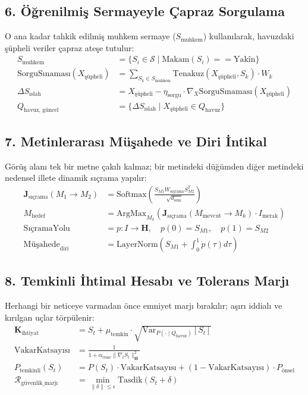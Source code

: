 \documentclass[11pt, a4paper]{article}
\begin{document}
\subsection{6. Öğrenilmiş Sermayeyle Çapraz Sorgulama}
O ana kadar tahkik edilmiş muhkem sermaye ($S_{\text{muhkem}}$) kullanılarak, havuzdaki şüpheli veriler çapraz ateşe tutulur:
\begin{align}
S_{\text{muhkem}} &= \{ S_i \in \mathcal{S} \mid \text{Makam}(S_i) == \text{Yakîn} \} \\
\text{SorguSınaması}(X_{\text{şüpheli}}) &= \sum_{S_k \in S_{\text{muhkem}}} \text{Tenakuz}\left( X_{\text{şüpheli}}, S_k \right) \cdot W_k \\
\Delta S_{\text{ıslah}} &= X_{\text{şüpheli}} - \eta_{\text{sorgu}} \cdot \nabla_{X} \text{SorguSınaması}(X_{\text{şüpheli}}) \\
Q_{\text{havuz, güncel}} &= \{ \Delta S_{\text{ıslah}} \mid X_{\text{şüpheli}} \in Q_{\text{havuz}} \}
\end{align}

\subsection{7. Metinlerarası Müşahede ve Diri İntikal}
Görüş alanı tek bir metne çakılı kalmaz; bir metindeki düğümden diğer metindeki nedensel illete dinamik sıçrama yapılır:
\begin{align}
\mathbf{J}_{\text{sıçrama}}(M_1 \to M_2) &= \text{Softmax}\left( \frac{S_{M1} W_{\text{sıçrama}} S_{M2}^T}{\sqrt{d_{\text{sem}}}} \right) \\
M_{\text{hedef}} &= \text{ArgMax}_{M_k} \left( \mathbf{J}_{\text{sıçrama}}(M_{\text{mevcut}} \to M_k) \cdot I_{\text{merak}} \right) \\
\text{SıçramaYolu} &= p : I \to \mathbf{H}, \quad p(0) = S_{M1}, \quad p(1) = S_{M2} \\
\text{Müşahede}_{\text{diri}} &= \text{LayerNorm}\left( S_{M1} + \int_0^1 \dot{p}(\tau) d\tau \right)
\end{align}

\subsection{8. Temkinli İhtimal Hesabı ve Tolerans Marjı}
Herhangi bir neticeye varmadan önce emniyet marjı bırakılır; aşırı iddialı ve kırılgan uçlar törpülenir:
\begin{align}
\mathbf{K}_{\text{ihtiyat}} &= S_t + \mu_{\text{temkin}} \cdot \sqrt{\text{Var}_{P(\cdot \mid Q_{\text{havuz}})}[S_t]} \\
\text{VakarKatsayısı} &= \frac{1}{1 + \alpha_{\text{ivme}} \|\nabla_t S_t\|_{\mathbf{H}}^2} \\
P_{\text{temkinli}}(S_t) &= P(S_t) \cdot \text{VakarKatsayısı} + (1 - \text{VakarKatsayısı}) \cdot P_{\text{önsel}} \\
\mathcal{R}_{\text{güvenlik\_marjı}} &= \min_{\|\delta\| \le \epsilon} \text{Tasdik}(S_t + \delta)
\end{align}
\end{document}
